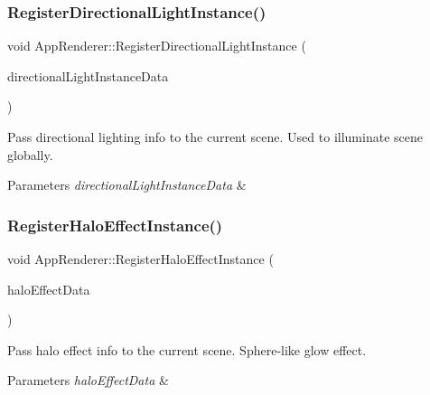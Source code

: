 \subsubsection{\texorpdfstring{Register\+Directional\+Light\+Instance()}{RegisterDirectionalLightInstance()}}
{\footnotesize\ttfamily void App\+Renderer\+::\+Register\+Directional\+Light\+Instance (\begin{DoxyParamCaption}\item[{const \hyperlink{structDirectionalLightInstanceData}{Directional\+Light\+Instance\+Data} \&}]{directional\+Light\+Instance\+Data }\end{DoxyParamCaption})}



Pass directional lighting info to the current scene. Used to illuminate scene globally. 


\begin{DoxyParams}{Parameters}
{\em directional\+Light\+Instance\+Data} & \\
\hline
\end{DoxyParams}
\mbox{\label{classAppRenderer_a8dcf762bbcbdce2de5e3f0a8810ab5dc}} 
\subsubsection{\texorpdfstring{Register\+Halo\+Effect\+Instance()}{RegisterHaloEffectInstance()}}
{\footnotesize\ttfamily void App\+Renderer\+::\+Register\+Halo\+Effect\+Instance (\begin{DoxyParamCaption}\item[{const \hyperlink{structHaloEffectInstanceData}{Halo\+Effect\+Instance\+Data} \&}]{halo\+Effect\+Data }\end{DoxyParamCaption})}



Pass halo effect info to the current scene. Sphere-\/like glow effect. 


\begin{DoxyParams}{Parameters}
{\em halo\+Effect\+Data} & \\
\hline
\end{DoxyParams}
\mbox{\label{classAppRenderer_a214f01562badba6e4f10038a239917f8}} 
